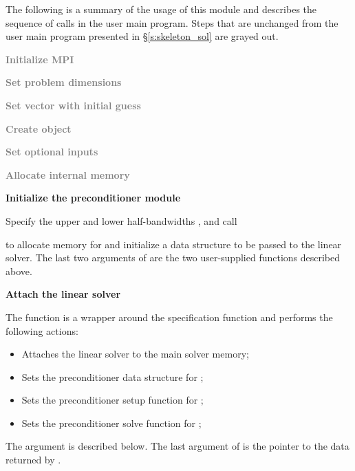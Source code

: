 The following is a summary of the usage of this module and describes the sequence
of calls in the user main program. Steps that are unchanged from the user main
program presented in \S\ref{s:skeleton_sol} are grayed out.
\begin{Steps}
\item 
  \textcolor{gray}{\bf Initialize MPI}

\item
  \textcolor{gray}{\bf Set problem dimensions}

\item
  \textcolor{gray}{\bf Set vector with initial guess}
 
\item
  \textcolor{gray}{\bf Create {\kinsol} object}

\item
  \textcolor{gray}{\bf Set optional inputs}

\item
  \textcolor{gray}{\bf Allocate internal memory}

\item \label{i:bbdpre_init}
  {\bf Initialize the {\kinbbdpre} preconditioner module}

  Specify the upper and lower half-bandwidths ,  and call


  to allocate memory for and initialize a data structure  to be 
  passed to the {\kinspgmr} linear solver. The last two arguments of
   are the two user-supplied functions described above.

\item \label{i:bbdpre_attach}
  {\bf Attach the {\kinspgmr} linear solver}


  The function  is a wrapper around the {\kinspgmr} specification
  function  and performs the following actions:
  \begin{itemize}
    \item Attaches the {\kinspgmr} linear solver to the main {\cvode} solver memory;
    \item Sets the preconditioner data structure for {\kinbbdpre};
    \item Sets the preconditioner setup function for {\kinbbdpre};
    \item Sets the preconditioner solve function for {\kinbbdpre};
  \end{itemize}
  The argument  is described below.
  The last argument of  is the pointer to the {\kinbbdpre} data
  returned by .


\end{Steps}
